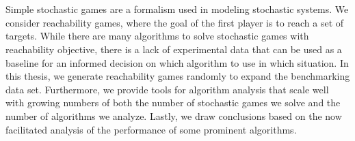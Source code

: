 \chapter*{\abstractname}
Simple stochastic games are a formalism used in modeling stochastic systems. 
We consider reachability games, where the goal of the first player is to reach a set of targets.
While there are many algorithms to solve stochastic games with reachability objective, 
there is a lack of experimental data that can be used as a baseline for an informed decision on which algorithm to use in which situation.
In this thesis, we generate reachability games randomly to expand the benchmarking data set.
Furthermore, we provide tools for algorithm analysis that scale well
with growing numbers of both the number of stochastic games we solve and the number of algorithms we analyze.
Lastly, we draw conclusions based on the now facilitated analysis of the performance of some prominent algorithms.